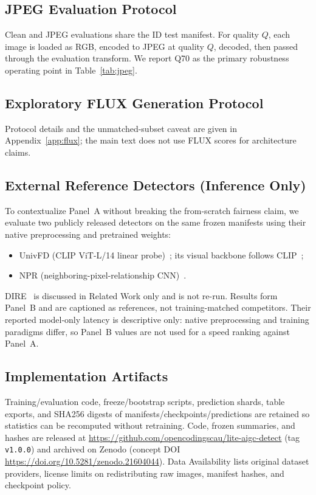 \subsection{JPEG Evaluation Protocol}

Clean and JPEG evaluations share the ID test manifest.
For quality $Q$, each image is loaded as RGB, encoded to JPEG at quality $Q$, decoded, then passed through the evaluation transform.
We report Q70 as the primary robustness operating point in Table~\ref{tab:jpeg}.

\subsection{Exploratory FLUX Generation Protocol}
\label{sec:flux-protocol}

Protocol details and the unmatched-subset caveat are given in Appendix~\ref{app:flux}; the main text does not use FLUX scores for architecture claims.

\subsection{External Reference Detectors (Inference Only)}
\label{sec:external-refs}

To contextualize Panel~A without breaking the from-scratch fairness claim, we evaluate two publicly released detectors on the same frozen manifests using their native preprocessing and pretrained weights:
\begin{itemize}
\item UnivFD (CLIP ViT-L/14 linear probe)~\cite{ojha2023ufd}; its visual backbone follows CLIP~\cite{radford2021clip};
\item NPR (neighboring-pixel-relationship CNN)~\cite{tan2024npr}.
\end{itemize}
DIRE~\cite{wang2023dire} is discussed in Related Work only and is not re-run.
Results form Panel~B and are captioned as references, not training-matched competitors.
Their reported model-only latency is descriptive only: native preprocessing and training paradigms differ, so Panel~B values are not used for a speed ranking against Panel~A.

\subsection{Implementation Artifacts}

Training/evaluation code, freeze/bootstrap scripts, prediction shards, table exports, and SHA256 digests of manifests/checkpoints/predictions are retained so statistics can be recomputed without retraining.
Code, frozen summaries, and hashes are released at \url{https://github.com/opencodingscau/lite-aigc-detect} (tag \texttt{v1.0.0}) and archived on Zenodo (concept DOI \url{https://doi.org/10.5281/zenodo.21604044}). Data Availability lists original dataset providers, license limits on redistributing raw images, manifest hashes, and checkpoint policy.
